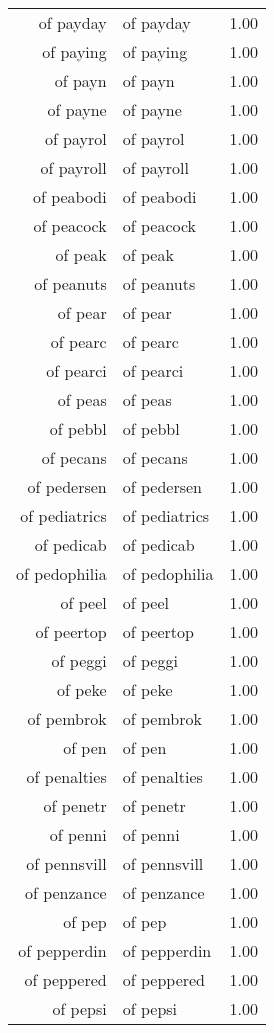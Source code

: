 \begin{table}[ht]
\begin{tabular}{rlr}
  of payday & of payday & 1.00 \\ 
  of paying & of paying & 1.00 \\ 
  of payn & of payn & 1.00 \\ 
  of payne & of payne & 1.00 \\ 
  of payrol & of payrol & 1.00 \\ 
  of payroll & of payroll & 1.00 \\ 
  of peabodi & of peabodi & 1.00 \\ 
  of peacock & of peacock & 1.00 \\ 
  of peak & of peak & 1.00 \\ 
  of peanuts & of peanuts & 1.00 \\ 
  of pear & of pear & 1.00 \\ 
  of pearc & of pearc & 1.00 \\ 
  of pearci & of pearci & 1.00 \\ 
  of peas & of peas & 1.00 \\ 
  of pebbl & of pebbl & 1.00 \\ 
  of pecans & of pecans & 1.00 \\ 
  of pedersen & of pedersen & 1.00 \\ 
  of pediatrics & of pediatrics & 1.00 \\ 
  of pedicab & of pedicab & 1.00 \\ 
  of pedophilia & of pedophilia & 1.00 \\ 
  of peel & of peel & 1.00 \\ 
  of peertop & of peertop & 1.00 \\ 
  of peggi & of peggi & 1.00 \\ 
  of peke & of peke & 1.00 \\ 
  of pembrok & of pembrok & 1.00 \\ 
  of pen & of pen & 1.00 \\ 
  of penalties & of penalties & 1.00 \\ 
  of penetr & of penetr & 1.00 \\ 
  of penni & of penni & 1.00 \\ 
  of pennsvill & of pennsvill & 1.00 \\ 
  of penzance & of penzance & 1.00 \\ 
  of pep & of pep & 1.00 \\ 
  of pepperdin & of pepperdin & 1.00 \\ 
  of peppered & of peppered & 1.00 \\ 
  of pepsi & of pepsi & 1.00 \\ 

\end{tabular}
\end{table}
